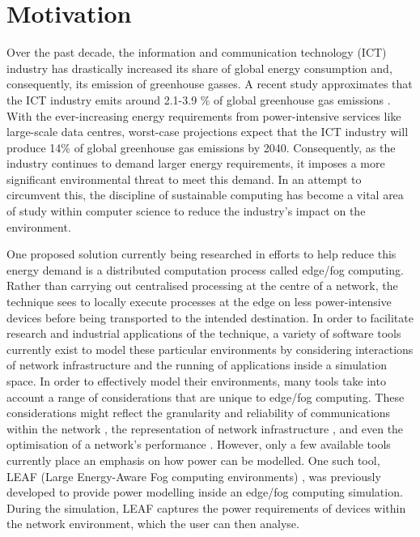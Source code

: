 \documentclass{l4proj}
\begin{document}

\section{Motivation}\label{intro:subsec:motivation}
Over the past decade, the information and communication technology (ICT) industry has drastically increased its share of global energy consumption and, consequently, its emission of greenhouse gasses.
A recent study approximates that the ICT industry emits around 2.1-3.9 \% of global greenhouse gas emissions \citep{current_energy_consumption}.
With the ever-increasing energy requirements from power-intensive services like large-scale data centres, worst-case projections expect that the ICT industry will produce 14\% of global greenhouse gas emissions by 2040\citep{co2Challenges}.
Consequently, as the industry continues to demand larger energy requirements, it imposes a more significant environmental threat to meet this demand.
In an attempt to circumvent this, the discipline of sustainable computing has become a vital area of study within computer science to reduce the industry's impact on the environment.

One proposed solution currently being researched in efforts to help reduce this energy demand is a distributed computation process called edge/fog computing.
Rather than carrying out centralised processing at the centre of a network, the technique sees to locally execute processes at the edge on less power-intensive devices before being transported to the intended destination.
In order to facilitate research and industrial applications of the technique, a variety of software tools currently exist to model these particular environments by considering interactions of network infrastructure and the running of applications inside a simulation space.
In order to effectively model their environments, many tools take into account a range of considerations that are unique to edge/fog computing.
These considerations might reflect the granularity and reliability of communications within the network \citep{FogNetSim}, the representation of network infrastructure \citep{ENIGMA}, and even the optimisation of a network's performance \citep{EdgeCloudSim}.
However, only a few available tools currently place an emphasis on how power can be modelled.
One such tool, LEAF (Large Energy-Aware Fog computing environments) \citep{leaf2021}, was previously developed to provide power modelling inside an edge/fog computing simulation.
During the simulation, LEAF captures the power requirements of devices within the network environment, which the user can then analyse.
\end{document}
